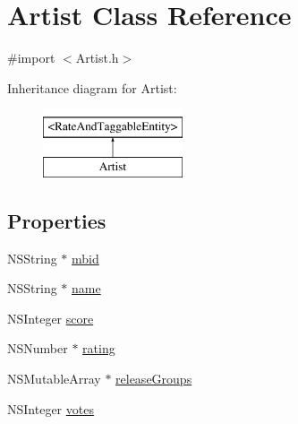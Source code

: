 \hypertarget{interface_artist}{\section{Artist Class Reference}
\label{interface_artist}
}


{\ttfamily \#import $<$Artist.\-h$>$}

Inheritance diagram for Artist\-:\begin{figure}[H]
\begin{center}
\leavevmode
\includegraphics[height=2.000000cm]{interface_artist}
\end{center}
\end{figure}
\subsection*{Properties}
\begin{DoxyCompactItemize}
\item 
N\-S\-String $\ast$ \hyperlink{interface_artist_a064ba61c840d05702f8f0972b1a2c890}{mbid}
\item 
N\-S\-String $\ast$ \hyperlink{interface_artist_a3f45a6c8d6fbb2705aeb5f6f99bfdb17}{name}
\item 
N\-S\-Integer \hyperlink{interface_artist_ade673c261f25a1199f87dc68377170db}{score}
\item 
N\-S\-Number $\ast$ \hyperlink{interface_artist_ac51cb6516fa2fde9c5ae32ffb0f6c477}{rating}
\item 
N\-S\-Mutable\-Array $\ast$ \hyperlink{interface_artist_ae7c9b0d52dc0453be0a79d5b32346cbf}{release\-Groups}
\item 
N\-S\-Integer \hyperlink{interface_artist_aae51dcb05865a3a2750d73eb0bf7a066}{votes}
\end{DoxyCompactItemize}


